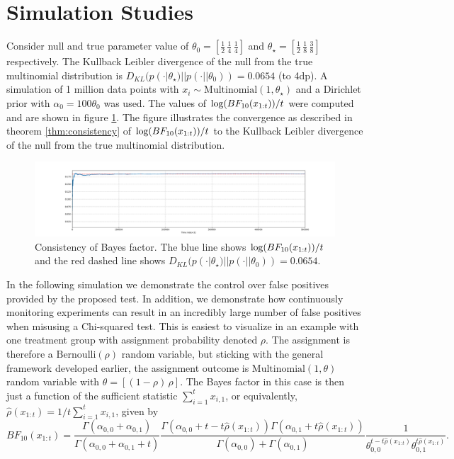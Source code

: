 \documentclass[11pt]{article}
\def\log{{\rm log}}
\begin{document}
\section{Simulation Studies}
\label{sec:simulation}
Consider null and true parameter value of $\theta_0=[\frac{1}{2}\, \frac{1}{4}\, \frac{1}{4}]$ and $\theta_\star=[\frac{1}{2}\, \frac{1}{8}\, \frac{3}{8}]$ respectively. The Kullback Leibler divergence of the null from the true multinomial distribution is $D_{KL}(p(\cdot|\theta_\star)||p(\cdot||\theta_0)) = 0.0654$ (to 4dp). A simulation of 1 million data points with $x_i \sim \text{Multinomial}(1, \theta_\star)$ and a Dirichlet prior with $\alpha_0 = 100\theta_0$ was used. The values of $\log(BF_{10}(x_{1:t}))/t$ were computed and are shown in figure \ref{fig:lbf}. The figure illustrates the convergence as described in theorem \ref{thm:consistency} of $\log(BF_{10}(x_{1:t}))/t$ to the Kullback Leibler divergence of the null from the true multinomial distribution.
\begin{figure}[H]
  \centering
  \includegraphics[scale=0.35]{images/consistency.png}
  \caption{Consistency of Bayes factor. The blue line shows $\log(BF_{10}(x_{1:t}))/t$ and the red dashed line shows $D_{KL}(p(\cdot|\theta_\star)||p(\cdot||\theta_0)) = 0.0654$.}
    \label{fig:lbf}
  \end{figure}
  In the following simulation we demonstrate the control over false positives provided by the proposed test. In addition, we demonstrate how continuously monitoring experiments can result in an incredibly large number of false positives when misusing a Chi-squared test. This is easiest to visualize in an example with one treatment group with assignment probability denoted $\rho$. The assignment is therefore a $\text{Bernoulli}(\rho)$ random variable, but sticking with the general framework developed earlier, the assignment outcome is $\text{Multinomial}(1,\theta)$ random variable with $\theta = [(1-\rho)\, \rho]$. The Bayes factor in this case is then just a function of the sufficient statistic $\sum_{i=1}^t x_{i,1}$, or equivalently, $\hat{\rho}(x_{1:t}) = 1/t \sum_{i=1}^{t} x_{i,1}$, given by
\begin{equation}
  \label{eq:bayes_factor}
 BF_{10}(x_{1:t})  = \frac{\Gamma(\alpha_{0,0}+\alpha_{0,1})}{\Gamma(\alpha_{0,0}+\alpha_{0,1}+t)}\frac{\Gamma(\alpha_{0,0} + t-t\hat{\rho}(x_{1:t} ))\Gamma(\alpha_{0,1} + t\hat{\rho}(x_{1:t} )) }{\Gamma(\alpha_{0,0} )+\Gamma(\alpha_{0,1} )}\frac{1}{\theta_{0,0}^{t-t\hat{\rho}(x_{1:t})}\theta_{0,1}^{t\hat{\rho}(x_{1:t})}}.
\end{equation}
\end{document}
